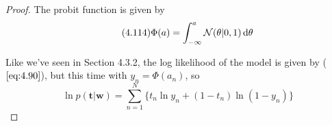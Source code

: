\vspace{1em}

\begin{proof}
    The probit function is given by 
    \begin{equation}\label{eq:4.114}\tag{4.114}
        \Phi(a) = \int_{-\infty}^{a} \mathcal{N}(\theta | 0, 1) \mathop{}\!\mathrm{d} \theta
    \end{equation}

    Like we've seen in Section 4.3.2, the log likelihood of 
    the model is given by ($\ref{eq:4.90}$), but this time with
    $y_n = \Phi(a_n)$, so
    \[
        \ln p(\mathbf{t} | \mathbf{w})
        = \sum_{n = 1}^{N} \{t_n \ln y_n + (1 - t_n) \ln(1 - y_n)\} 
    \] 
\end{proof}

